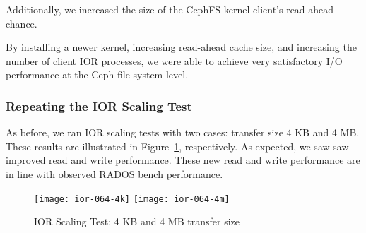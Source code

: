 


Additionally, we increased the size of the CephFS kernel client's read-ahead
chance.  

\begin{comment}
\begin{figure}[htb]
\centering
\texttt{[image: ior\_kernel\_change]}
\caption{CephFS performance with kernel changes to 3.9, IOR with 4 MB transfer
size}
\label{fig:ior-kernel-39}
\end{figure}
\end{comment}

By installing a newer kernel, increasing read-ahead cache size, and increasing
the number of client IOR processes, we were able to achieve very satisfactory
I/O performance at the Ceph file system-level.


\subsubsection{Repeating the IOR Scaling Test}

As before, we ran IOR scaling tests with two cases: transfer size 4 KB and 4
MB.  These results are illustrated in Figure~\ref{fig:ior-064}, respectively.
As expected, we saw saw  improved read and write performance. These new read
and write performance are in line with observed RADOS bench performance.


\begin{figure}[htb]
\centering
\texttt{[image: ior-064-4k]}
\texttt{[image: ior-064-4m]}
\caption{IOR Scaling Test: 4 KB and 4 MB transfer size}
\label{fig:ior-064}
\end{figure}

